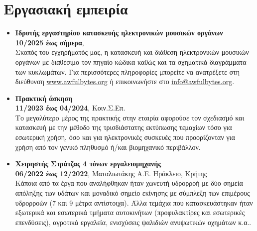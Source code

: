 \documentclass[a4paper,9pt]{extarticle}
\begin{document}
\section*{Εργασιακή εμπειρία}
\noindent
\begin{itemize}
  \item{\textbf{Ιδρυτής εργαστηρίου κατασκευής ηλεκτρονικών μουσικών οργάνων}}\\
    \textbf{10/2025 έως σήμερα}, \\
  Σκοπός του εγχηρήματός μας, η κατασκευή και διάθεση ηλεκτρονικών μουσικών οργάνων με διαθέσιμο τον πηγαίο κώδικα καθώς και τα σχηματικά διαγράμματα των κυκλωμάτων. Για περισσότερες πληροφορίες μπορείτε να ανατρέξετε στη διεύθυνση  \href{https://awfulbytes.org}{www.awfulbytes.org} ή επικοινωνήστε στο  \href{maito:info@awfulbytes.org}{info@awfulbytes.org}.\\
  \item{\textbf{Πρακτική άσκηση}}\\
        \textbf{11/2023 έως 04/2024}, Κοιν.Σ.Επ. \\
        Το μεγαλύτερο μέρος της πρακτικής στην εταιρία αφορούσε τον σχεδιασμό και κατασκευή με την μέθοδο της τρισδιάστατης εκτύπωσης τεμαχίων τόσο για εσωτερική χρήση, όσο και για ηλεκτρονικές συσκευές που προορίζονταν για χρήση από τον γενικό πληθυσμό ή/και βιομηχανικό περιβάλλον. \\
  \item{\textbf{Χειρηστής Στράτζας 4 τόνων  εργαλειομηχανής}} \\
        \textbf{06/2022 έως 12/2022}, Ματαλιωτάκης Α.Ε. Ηράκλειο, Κρήτης \\
        Κάποια από τα έργα που αναλήφθηκαν ήταν χωνευτή υδρορροή με δύο σημεία απόληξης των υδάτων και μοναδικό σημείο εκίνησης με σύμπλεξη των επιμέρους υδρορροών (7 και 9 μέτρα αντίστοιχα). Άλλα τεμάχια που κατασκευάστηκαν ήταν εξωτερικά και εσωτερικά τμήματα αυτοκινήτων (προφυλακτίρες και εσωτερικές επενδύσεις), αγροτικά εργαλεία, ενισχύσεις ψαλιδιών ανυψωτικών οχημάτων κ.α.. \\
\end{itemize}


\end{document}
